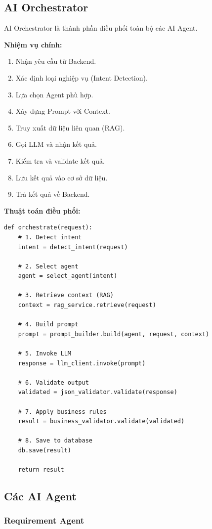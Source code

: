 \documentclass[12pt,a4paper]{report}
\begin{document}
\subsection{AI Orchestrator}

AI Orchestrator là thành phần điều phối toàn bộ các AI Agent.

\textbf{Nhiệm vụ chính:}

\begin{enumerate}
\item Nhận yêu cầu từ Backend.
\item Xác định loại nghiệp vụ (Intent Detection).
\item Lựa chọn Agent phù hợp.
\item Xây dựng Prompt với Context.
\item Truy xuất dữ liệu liên quan (RAG).
\item Gọi LLM và nhận kết quả.
\item Kiểm tra và validate kết quả.
\item Lưu kết quả vào cơ sở dữ liệu.
\item Trả kết quả về Backend.
\end{enumerate}

\textbf{Thuật toán điều phối:}

\begin{verbatim}
def orchestrate(request):
    # 1. Detect intent
    intent = detect_intent(request)

    # 2. Select agent
    agent = select_agent(intent)

    # 3. Retrieve context (RAG)
    context = rag_service.retrieve(request)

    # 4. Build prompt
    prompt = prompt_builder.build(agent, request, context)

    # 5. Invoke LLM
    response = llm_client.invoke(prompt)

    # 6. Validate output
    validated = json_validator.validate(response)

    # 7. Apply business rules
    result = business_validator.validate(validated)

    # 8. Save to database
    db.save(result)

    return result
\end{verbatim}

\subsection{Các AI Agent}

\subsubsection{Requirement Agent}
\end{document}
